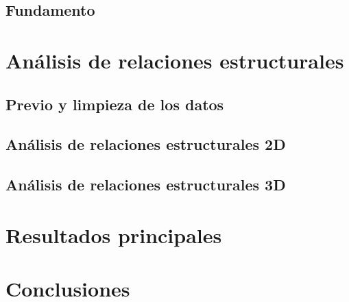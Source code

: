 \documentclass[11pt, a4paper]{article} %
\begin{document}
\subsection{Fundamento}
\section{Análisis de relaciones estructurales}
\subsection{Previo y limpieza de los datos}
\subsection{Análisis de relaciones estructurales 2D}
\subsection{Análisis de relaciones estructurales 3D}

\section{Resultados principales}
\section{Conclusiones}

\end{document}
